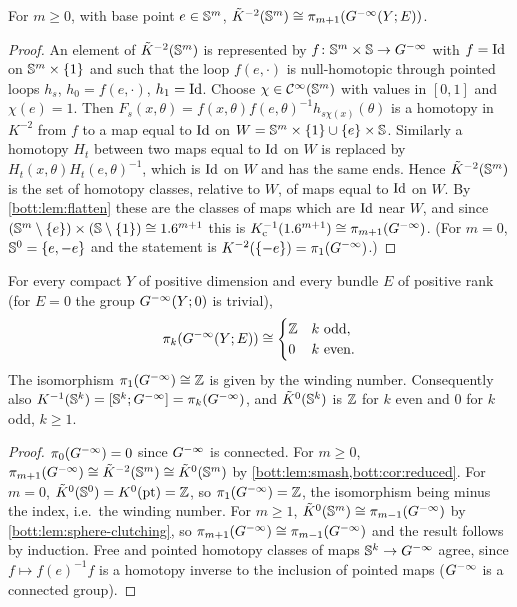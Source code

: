 \begin{lemma}\label{bott:lem:smash}
  For $m\ge0$, with base point $e\in\mathbb{S}^m$, $\tilde K^{-2}(\mathbb{S}^m)\cong\pi_{m+1}(G^{-\infty}(Y;E))$.
\end{lemma}
\begin{proof}
  An element of $\tilde K^{-2}(\mathbb{S}^m)$ is represented by $f\colon\mathbb{S}^m\times\mathbb{S}\to G^{-\infty}$
  with $f=\operatorname{Id}$ on $\mathbb{S}^m\times\{1\}$ and such that the loop $f(e,\cdot)$ is null-homotopic
  through pointed loops $h_s$, $h_0=f(e,\cdot)$, $h_1=\operatorname{Id}$. Choose $\chi\in\mathcal{C}^\infty(\mathbb{S}^m)$ with
  values in $[0,1]$ and $\chi(e)=1$. Then
  $F_s(x,\theta)=f(x,\theta)f(e,\theta)^{-1}h_{s\chi(x)}(\theta)$ is a homotopy in $K^{-2}$
  from $f$ to a map equal to $\operatorname{Id}$ on $W=\mathbb{S}^m\times\{1\}\cup\{e\}\times\mathbb{S}$. Similarly a
  homotopy $H_t$ between two maps equal to $\operatorname{Id}$ on $W$ is replaced by
  $H_t(x,\theta)H_t(e,\theta)^{-1}$, which is $\operatorname{Id}$ on $W$ and has the same ends. Hence
  $\tilde K^{-2}(\mathbb{S}^m)$ is the set of homotopy classes, relative to $W$, of maps equal to
  $\operatorname{Id}$ on $W$. By \cref{bott:lem:flatten} these are the classes of maps which are $\operatorname{Id}$ near
  $W$, and since $(\mathbb{S}^m\setminus\{e\})\times(\mathbb{S}\setminus\{1\})\cong1.6^{m+1}$ this is
  $K_{\mathrm{c}}^{-1}(1.6^{m+1})\cong\pi_{m+1}(G^{-\infty})$. (For $m=0$, $\mathbb{S}^0=\{e,-e\}$ and the statement
  is $K^{-2}(\{-e\})=\pi_1(G^{-\infty})$.)
\end{proof}

\begin{corollary}\label{bott:cor:homotopy-groups}
  For every compact $Y$ of positive dimension and every bundle $E$ of positive rank (for $E=0$ the group $G^{-\infty}(Y;0)$ is trivial),
  \begin{equation*}
    \pi_k(G^{-\infty}(Y;E))\cong\begin{cases}\mathbb{Z}&k\text{ odd},\\0&k\text{ even}.\end{cases}
  \end{equation*}
  The isomorphism $\pi_1(G^{-\infty})\cong\mathbb{Z}$ is given by the winding number. Consequently also
  $K^{-1}(\mathbb{S}^k)=[\mathbb{S}^k;G^{-\infty}]=\pi_k(G^{-\infty})$, and $\tilde K^0(\mathbb{S}^k)$ is $\mathbb{Z}$ for
  $k$ even and $0$ for $k$ odd, $k\ge1$.
\end{corollary}
\begin{proof}
  $\pi_0(G^{-\infty})=0$ since $G^{-\infty}$ is connected. For $m\ge0$,
  $\pi_{m+1}(G^{-\infty})\cong\tilde K^{-2}(\mathbb{S}^m)\cong\tilde K^0(\mathbb{S}^m)$ by
  \cref{bott:lem:smash,bott:cor:reduced}. For $m=0$, $\tilde K^0(\mathbb{S}^0)=K^0(\mathrm{pt})=\mathbb{Z}$,
  so $\pi_1(G^{-\infty})=\mathbb{Z}$, the isomorphism being minus the index, i.e.\ the winding number. For
  $m\ge1$, $\tilde K^0(\mathbb{S}^m)\cong\pi_{m-1}(G^{-\infty})$ by \cref{bott:lem:sphere-clutching}, so
  $\pi_{m+1}(G^{-\infty})\cong\pi_{m-1}(G^{-\infty})$ and the result follows by induction. Free and pointed
  homotopy classes of maps $\mathbb{S}^k\to G^{-\infty}$ agree, since $f\mapsto f(e)^{-1}f$ is a
  homotopy inverse to the inclusion of pointed maps ($G^{-\infty}$ is a connected group).
\end{proof}

